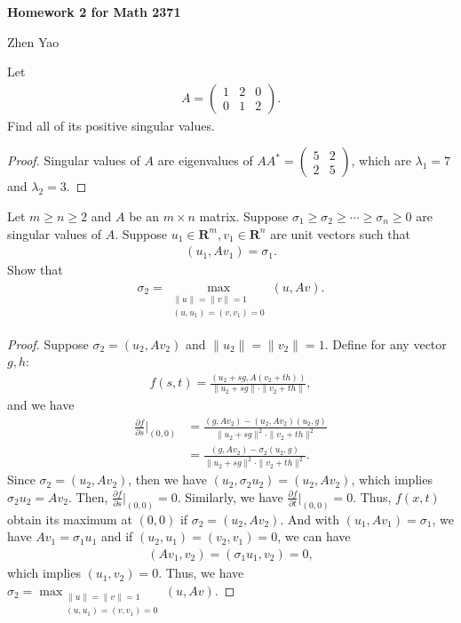 \documentclass[12pt,leqno]{amsart}
\begin{document}
\centerline{\bf Homework 2 for Math 2371}
\centerline{Zhen Yao}

\medskip

 Let 
\begin{align*}
    A = \begin{pmatrix}
    1 & 2 & 0 \\
    0 & 1 & 2
    \end{pmatrix}.
\end{align*}
Find all of its positive singular values.
\begin{proof}
Singular values of $A$ are eigenvalues of $AA^* = \begin{pmatrix}
    5 & 2  \\
    2 & 5 
    \end{pmatrix}$, which are $\lambda_1 = 7$ and $\lambda_2 = 3$.
\end{proof}

\medskip

 Let $m \geq n \geq 2$ and $A$ be an $m\times n$ matrix. Suppose $\sigma_1 \geq \sigma_2 \geq \cdots \geq \sigma_n \geq 0$ are singular values of $A$. Suppose $u_1\in \mathbf{R}^m, v_1 \in \mathbf{R}^n$  are unit vectors such that 
\begin{align*}
    (u_1, Av_1) = \sigma_1.
\end{align*}
Show that 
\begin{align*}
    \sigma_2 = \max_{ \substack{\|u\| = \|v\| = 1\\
                     (u,u_1) = (v, v_1) = 0}}
    (u, Av).
\end{align*}
\begin{proof}
Suppose $\sigma_2 = (u_2, Av_2)$ and $\|u_2\| = \|v_2\| = 1$. Define for any vector $g,h$:
\begin{align*}
    f(s,t) = \frac{(u_2+sg, A(v_2+th))}{\|u_2+sg\|\cdot \|v_2+th\|},
\end{align*}
and we have
\begin{align*}
    \frac{\partial f}{\partial s}\bigg|_{(0,0)} & = \frac{(g, Av_2) - (u_2, Av_2)(u_2, g)}{\|u_2+sg\|^2\cdot \|v_2+th\|^2} \\
    & = \frac{(g, Av_2) - \sigma_2(u_2, g)}{\|u_2+sg\|^2\cdot \|v_2+th\|^2}.
\end{align*}
Since $\sigma_2 = (u_2, Av_2)$, then we have $(u_2,\sigma_2 u_2) = (u_2, Av_2)$, which implies $\sigma_2 u_2 = Av_2$. Then, $\frac{\partial f}{\partial s}\bigg|_{(0,0)} = 0$. Similarly, we have $\frac{\partial f}{\partial t}\bigg|_{(0,0)} = 0$. Thus, $f(x,t)$ obtain its maximum at $(0,0)$ if $\sigma_2 = (u_2, Av_2)$. And with $(u_1, Av_1) = \sigma_1$, we have $Av_1 = \sigma_1 u_1$ and if $(u_2,u_1) = (v_2, v_1) = 0$, we can have 
\begin{align*}
    (Av_1, v_2) = (\sigma_1 u_1, v_2) = 0,
\end{align*}
which implies $(u_1, v_2) = 0$. Thus, we have $\sigma_2 = \max_{ \substack{\|u\| = \|v\| = 1\\
                     (u,u_1) = (v, v_1) = 0}}
    (u, Av)$.
\end{proof}
\end{document}

